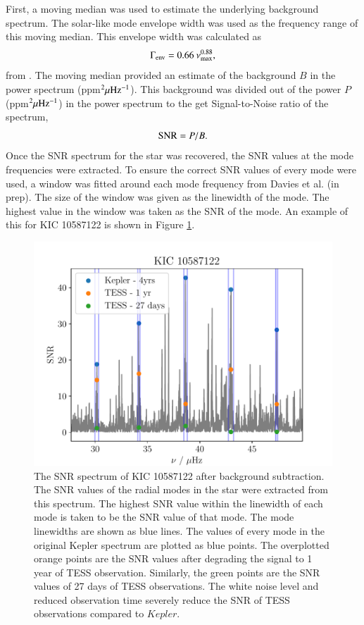 \documentclass[a4paper,fleqn,usenatbib,useAMS]{mnras}
\newcommand{\numax}{\ensuremath{\nu_{\textrm{max}}}}
\newcommand{\kep}{\ensuremath{Kepler}\:}
\begin{document}
First, a moving median was used to estimate the underlying background spectrum. The solar-like mode envelope width was used as the frequency range of this moving median. This envelope width was calculated as
\begin{equation}
\Gamma_{\rm env} = 0.66 \: \numax^{0.88},
\end{equation}
from \citet{mosser_characterization_2012}. The moving median provided an estimate of the background $B$ in the power spectrum (ppm$^{2} \mu\rm Hz^{-1}$). This background was divided out of the power $P$ (ppm$^{2} \mu\rm Hz^{-1}$) in the power spectrum to the get Signal-to-Noise ratio of the spectrum,
\begin{equation}
\label{eq:snr}
{\rm SNR} = P/B.
\end{equation}
Once the SNR spectrum for the star was recovered, the SNR values at the mode frequencies were extracted. To ensure the correct SNR values of every mode were used, a window was fitted around each mode frequency from Davies et al. (in prep). The size of the window was given as the linewidth of the mode. The highest value in the window was taken as the SNR of the mode. An example of this for KIC 10587122 is shown in Figure \ref{snr}.
\begin{figure}
	\centering
	\includegraphics[scale=0.5]{plot4_SNR10587122.pdf}
	\caption{The SNR spectrum of KIC 10587122 after background subtraction. The SNR values of the radial modes in the star were extracted from this spectrum. The highest SNR value within the linewidth of each mode is taken to be the SNR value of that mode. The mode linewidths are shown as blue lines. The values of every mode in the original Kepler spectrum are plotted as blue points. The overplotted orange points are the SNR values after degrading the signal to 1 year of TESS observation. Similarly, the green points are the SNR values of 27 days of TESS observations. The white noise level and reduced observation time severely reduce the SNR of TESS observations compared to \kep.}	
	\label{snr}
\end{figure}
\end{document}
